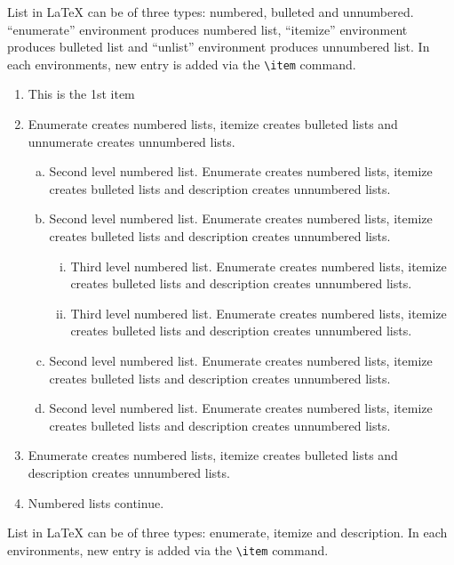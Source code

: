 \documentclass[unnumsec,webpdf,contemporary,large]{oup-authoring-template}%
\theoremstyle{thmstyleone}%
\theoremstyle{thmstyletwo}%
\theoremstyle{thmstylethree}%
\begin{document}
List in \LaTeX{} can be of three types: numbered, bulleted and unnumbered. ``enumerate'' environment produces numbered list,
``itemize'' environment produces bulleted list and ``unlist'' environment produces unnumbered list.
In each environments, new entry is added via the \verb+\item+ command.
\begin{enumerate}[1.]
\item This is the 1st item

\item Enumerate creates numbered lists, itemize creates bulleted lists and
unnumerate creates unnumbered lists.
\begin{enumerate}[(a)]
\item Second level numbered list. Enumerate creates numbered lists, itemize creates bulleted lists and
description creates unnumbered lists.

\item Second level numbered list. Enumerate creates numbered lists, itemize creates bulleted lists and
description creates unnumbered lists.
\begin{enumerate}[(ii)]
\item Third level numbered list. Enumerate creates numbered lists, itemize creates bulleted lists and
description creates unnumbered lists.

\item Third level numbered list. Enumerate creates numbered lists, itemize creates bulleted lists and
description creates unnumbered lists.
\end{enumerate}

\item Second level numbered list. Enumerate creates numbered lists, itemize creates bulleted lists and
description creates unnumbered lists.

\item Second level numbered list. Enumerate creates numbered lists, itemize creates bulleted lists and
description creates unnumbered lists.
\end{enumerate}

\item Enumerate creates numbered lists, itemize creates bulleted lists and
description creates unnumbered lists.

\item Numbered lists continue.
\end{enumerate}
List in \LaTeX{} can be of three types: enumerate, itemize and description.
In each environments, new entry is added via the \verb+\item+ command.
\end{document}
